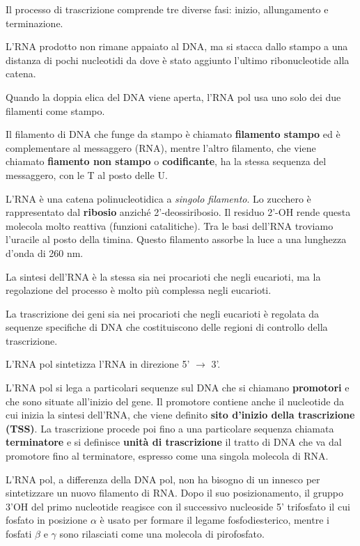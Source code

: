 \documentclass[11pt]{book}
\begin{document}
Il processo di trascrizione comprende tre diverse fasi: inizio,
allungamento e terminazione.

L'RNA prodotto non rimane appaiato al DNA, ma si stacca dallo stampo a
una distanza di pochi nucleotidi da dove è stato aggiunto l'ultimo
ribonucleotide alla catena.

Quando la doppia elica del DNA viene aperta, l'RNA pol usa uno solo dei
due filamenti come stampo.

Il filamento di DNA che funge da stampo è chiamato \textbf{filamento
stampo} ed è complementare al messaggero (RNA), mentre l'altro
filamento, che viene chiamato \textbf{fiamento non stampo} o
\textbf{codificante}, ha la stessa sequenza del messaggero, con le T al
posto delle U.

L'RNA è una catena polinucleotidica a \emph{singolo filamento}. Lo
zucchero è rappresentato dal \textbf{ribosio} anziché 2'-deossiribosio.
Il residuo 2'-OH rende questa molecola molto reattiva (funzioni
catalitiche). Tra le basi dell'RNA troviamo l'uracile al posto della
timina. Questo filamento assorbe la luce a una lunghezza d'onda di 260
nm.

La sintesi dell'RNA è la stessa sia nei procarioti che negli eucarioti,
ma la regolazione del processo è molto più complessa negli eucarioti.

La trascrizione dei geni sia nei procarioti che negli eucarioti è
regolata da sequenze specifiche di DNA che costituiscono delle regioni
di controllo della trascrizione.

L'RNA pol sintetizza l'RNA in direzione 5' \(\rightarrow\) 3'.

L'RNA pol si lega a particolari sequenze sul DNA che si chiamano
\textbf{promotori} e che sono situate all'inizio del gene. Il promotore
contiene anche il nucleotide da cui inizia la sintesi dell'RNA, che
viene definito \textbf{sito d'inizio della trascrizione (TSS)}. La
trascrizione procede poi fino a una particolare sequenza chiamata
\textbf{terminatore} e si definisce \textbf{unità di trascrizione} il
tratto di DNA che va dal promotore fino al terminatore, espresso come
una singola molecola di RNA.

L'RNA pol, a differenza della DNA pol, non ha bisogno di un innesco per
sintetizzare un nuovo filamento di RNA. Dopo il suo posizionamento, il
gruppo 3'OH del primo nucleotide reagisce con il successivo nucleoside
5' trifosfato il cui fosfato in posizione \(\alpha\) è usato per formare
il legame fosfodiesterico, mentre i fosfati \(\beta\) e \(\gamma\) sono
rilasciati come una molecola di pirofosfato.
\end{document}
